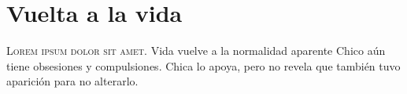 

\chapter{Vuelta a la vida}
\lettrine{L}{orem ipsum dolor sit amet}. Vida vuelve a la normalidad aparente
Chico aún tiene obsesiones y compulsiones. Chica lo apoya, pero no revela que también tuvo aparición para no alterarlo.